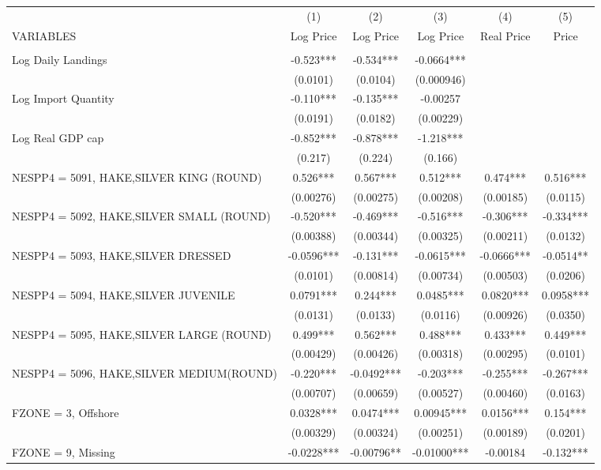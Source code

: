 \begin{tabular}{lccccc} \hline
 & (1) & (2) & (3) & (4) & (5) \\
VARIABLES & Log Price & Log Price & Log Price & Real Price & Price \\ \hline
 &  &  &  &  &  \\
Log Daily Landings & -0.523*** & -0.534*** & -0.0664*** &  &  \\
 & (0.0101) & (0.0104) & (0.000946) &  &  \\
Log Import Quantity & -0.110*** & -0.135*** & -0.00257 &  &  \\
 & (0.0191) & (0.0182) & (0.00229) &  &  \\
Log Real GDP cap & -0.852*** & -0.878*** & -1.218*** &  &  \\
 & (0.217) & (0.224) & (0.166) &  &  \\
NESPP4 = 5091, HAKE,SILVER KING (ROUND) & 0.526*** & 0.567*** & 0.512*** & 0.474*** & 0.516*** \\
 & (0.00276) & (0.00275) & (0.00208) & (0.00185) & (0.0115) \\
NESPP4 = 5092, HAKE,SILVER SMALL (ROUND) & -0.520*** & -0.469*** & -0.516*** & -0.306*** & -0.334*** \\
 & (0.00388) & (0.00344) & (0.00325) & (0.00211) & (0.0132) \\
NESPP4 = 5093, HAKE,SILVER DRESSED & -0.0596*** & -0.131*** & -0.0615*** & -0.0666*** & -0.0514** \\
 & (0.0101) & (0.00814) & (0.00734) & (0.00503) & (0.0206) \\
NESPP4 = 5094, HAKE,SILVER JUVENILE & 0.0791*** & 0.244*** & 0.0485*** & 0.0820*** & 0.0958*** \\
 & (0.0131) & (0.0133) & (0.0116) & (0.00926) & (0.0350) \\
NESPP4 = 5095, HAKE,SILVER LARGE (ROUND) & 0.499*** & 0.562*** & 0.488*** & 0.433*** & 0.449*** \\
 & (0.00429) & (0.00426) & (0.00318) & (0.00295) & (0.0101) \\
NESPP4 = 5096, HAKE,SILVER MEDIUM(ROUND) & -0.220*** & -0.0492*** & -0.203*** & -0.255*** & -0.267*** \\
 & (0.00707) & (0.00659) & (0.00527) & (0.00460) & (0.0163) \\
FZONE = 3, Offshore & 0.0328*** & 0.0474*** & 0.00945*** & 0.0156*** & 0.154*** \\
 & (0.00329) & (0.00324) & (0.00251) & (0.00189) & (0.0201) \\
FZONE = 9, Missing & -0.0228*** & -0.00796** & -0.01000*** & -0.00184 & -0.132*** \\

\end{tabular}
